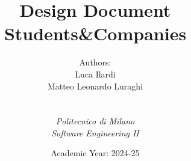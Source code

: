 
\def\Company{Consultancy}
\def\Institute{\textit{Politecnico di Milano}}
\def\Course{\textit{Software Engineering II}}

\def\BoldTitle{Design Document}

\def\Subtitle{Students\&Companies}
\def\Authors{
    Authors:\newline
    
    Luca Ilardi\newline
    
    Matteo Leonardo Luraghi
} 

\title{\textbf{\BoldTitle}\\\Subtitle}
\author{ 
    Authors:\\
    Luca Ilardi\\
    Matteo Leonardo Luraghi
    \\ \\ \\ \Institute\\ \Course}
\date{Academic Year: 2024-25}

